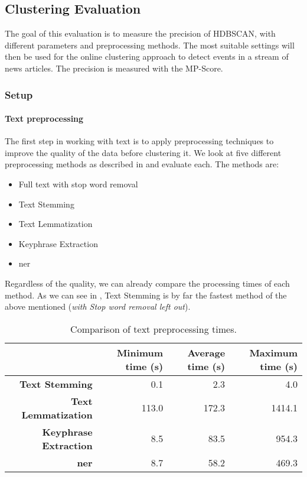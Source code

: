 \subsection{Clustering Evaluation}
\label{subsec:5a_clustering_evaluation}

The goal of this evaluation is to measure the precision of HDBSCAN, with different parameters and preprocessing methods.
The most suitable settings will then be used for the online clustering approach to detect events in a stream of news articles.
The precision is measured with the MP-Score.

\subsubsection{Setup}
\label{subsubsec:5a_setup}

\paragraph{Text preprocessing}
The first step in working with text is to apply preprocessing techniques
to improve the quality of the data before clustering it.
We look at five different preprocessing methods as described in 
and evaluate each.
The methods are:

\begin{itemize}
    \item Full text with stop word removal
    \item Text Stemming
    \item Text Lemmatization
    \item Keyphrase Extraction
    \item \Gls{ner}
\end{itemize}

Regardless of the quality, we can already compare the processing times of each method.
As we can see in , Text Stemming is by far the fastest method of the above mentioned
(\textit{with Stop word removal left out}).

\begin{table}[h]
    \centering
    \begin{tabular}{|r|r|r|r|}
    \hline
     & \textbf{Minimum time (s)} & \textbf{Average time (s)} & \textbf{Maximum time (s)} \\ \hline
    \textbf{Text Stemming} & 0.1 & 2.3 & 4.0 \\ \hline
    \textbf{Text Lemmatization} & 113.0 & 172.3 & 1414.1 \\ \hline
    \textbf{Keyphrase Extraction} & 8.5 & 83.5 & 954.3 \\ \hline
    \textbf{\Gls{ner}} & 8.7 & 58.2 & 469.3 \\ \hline
    \end{tabular}
    \caption{Comparison of text preprocessing times.}
    \label{tab:preprocessing_times}
\end{table}

